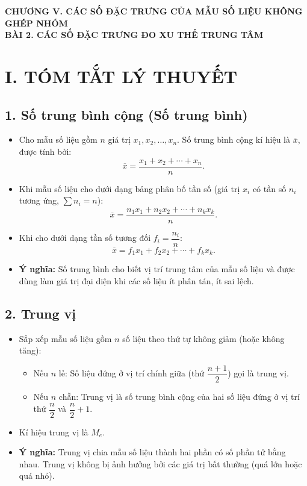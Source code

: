 
\begin{center}
	{\Large\bfseries\color{blue!80!black} CHƯƠNG V. CÁC SỐ ĐẶC TRƯNG CỦA MẪU SỐ LIỆU KHÔNG GHÉP NHÓM}\\[6pt]
	{\large\bfseries\color{red!80!black} BÀI 2. CÁC SỐ ĐẶC TRƯNG ĐO XU THẾ TRUNG TÂM}
\end{center}
\vspace{0.2cm}

\section*{I. TÓM TẮT LÝ THUYẾT}

\subsection*{1. Số trung bình cộng (Số trung bình)}
\begin{itemize}
	\item Cho mẫu số liệu gồm $n$ giá trị $x_1, x_2, \ldots, x_n$. Số trung bình cộng kí hiệu là $\overline{x}$, được tính bởi:
	\[\overline{x} = \frac{x_1 + x_2 + \cdots + x_n}{n}.\]
	\item Khi mẫu số liệu cho dưới dạng bảng phân bố tần số (giá trị $x_i$ có tần số $n_i$ tương ứng, $\sum n_i = n$):
	\[\overline{x} = \frac{n_1 x_1 + n_2 x_2 + \cdots + n_k x_k}{n}.\]
	\item Khi cho dưới dạng tần số tương đối $f_i = \dfrac{n_i}{n}$:
	\[\overline{x} = f_1 x_1 + f_2 x_2 + \cdots + f_k x_k.\]
	\item \textbf{Ý nghĩa:} Số trung bình cho biết vị trí trung tâm của mẫu số liệu và được dùng làm giá trị đại diện khi các số liệu ít phân tán, ít sai lệch.
\end{itemize}

\subsection*{2. Trung vị}
\begin{itemize}
	\item Sắp xếp mẫu số liệu gồm $n$ số liệu theo thứ tự không giảm (hoặc không tăng):
	\begin{itemize}
		\item Nếu $n$ lẻ: Số liệu đứng ở vị trí chính giữa (thứ $\dfrac{n+1}{2}$) gọi là trung vị.
		\item Nếu $n$ chẵn: Trung vị là số trung bình cộng của hai số liệu đứng ở vị trí thứ $\dfrac{n}{2}$ và $\dfrac{n}{2} + 1$.
	\end{itemize}
	\item Kí hiệu trung vị là $M_e$.
	\item \textbf{Ý nghĩa:} Trung vị chia mẫu số liệu thành hai phần có số phần tử bằng nhau. Trung vị không bị ảnh hưởng bởi các giá trị bất thường (quá lớn hoặc quá nhỏ).
\end{itemize}

